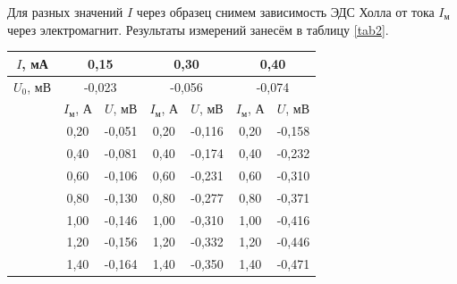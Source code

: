 \documentclass[a4paper,12pt]{article} %
\begin{document}
Для разных значений $ I $ через образец снимем зависимость ЭДС Холла от тока $ I_\text{м} $ через электромагнит. Результаты измерений занесём в таблицу \ref{tab2}.

\begin{table}[H]
	\centering
	\begin{tabular}{l|cc|cc|cc|}
		\hline
		\multicolumn{1}{|c|}{$I$, мА}   & \multicolumn{2}{c|}{0,15}                      & \multicolumn{2}{c|}{0,30}                      & \multicolumn{2}{c|}{0,40}                      \\ \hline
		\multicolumn{1}{|c|}{$U_0$, мВ} & \multicolumn{2}{c|}{-0,023}                    & \multicolumn{2}{c|}{-0,056}                    & \multicolumn{2}{c|}{-0,074}                    \\ \hline
		\multicolumn{1}{c|}{}           & \multicolumn{1}{c|}{$I_\text{м}$, А} & $U$, мВ & \multicolumn{1}{c|}{$I_\text{м}$, А} & $U$, мВ & \multicolumn{1}{c|}{$I_\text{м}$, А} & $U$, мВ \\ \cline{2-7} 
		\multicolumn{1}{c|}{}           & \multicolumn{1}{c|}{0,20}            & -0,051  & \multicolumn{1}{c|}{0,20}            & -0,116  & \multicolumn{1}{c|}{0,20}            & -0,158  \\ \cline{2-7} 
		\multicolumn{1}{c|}{}           & \multicolumn{1}{c|}{0,40}            & -0,081  & \multicolumn{1}{c|}{0,40}            & -0,174  & \multicolumn{1}{c|}{0,40}            & -0,232  \\ \cline{2-7} 
		\multicolumn{1}{c|}{}           & \multicolumn{1}{c|}{0,60}            & -0,106  & \multicolumn{1}{c|}{0,60}            & -0,231  & \multicolumn{1}{c|}{0,60}            & -0,310  \\ \cline{2-7} 
		\multicolumn{1}{c|}{}           & \multicolumn{1}{c|}{0,80}            & -0,130  & \multicolumn{1}{c|}{0,80}            & -0,277  & \multicolumn{1}{c|}{0,80}            & -0,371  \\ \cline{2-7} 
		\multicolumn{1}{c|}{}           & \multicolumn{1}{c|}{1,00}            & -0,146  & \multicolumn{1}{c|}{1,00}            & -0,310  & \multicolumn{1}{c|}{1,00}            & -0,416  \\ \cline{2-7} 
		\multicolumn{1}{c|}{}           & \multicolumn{1}{c|}{1,20}            & -0,156  & \multicolumn{1}{c|}{1,20}            & -0,332  & \multicolumn{1}{c|}{1,20}            & -0,446  \\ \cline{2-7} 
		\multicolumn{1}{c|}{}           & \multicolumn{1}{c|}{1,40}            & -0,164  & \multicolumn{1}{c|}{1,40}            & -0,350  & \multicolumn{1}{c|}{1,40}            & -0,471  \\ \hline

\end{tabular}
\end{table}
\end{document}
